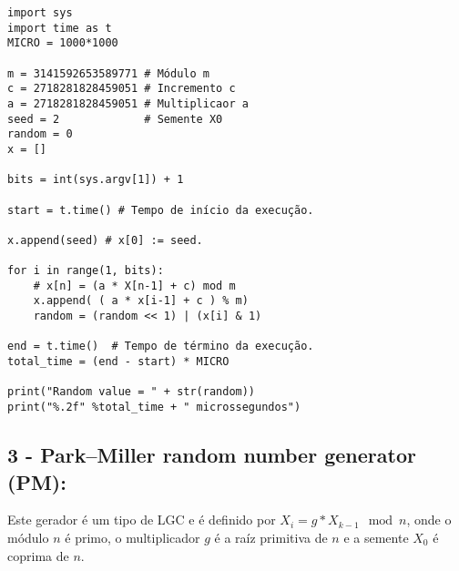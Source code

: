 \documentclass[
    article,            %
    11pt,               %
    oneside,            %
    a4paper,            %
    english,            %
    brazil,             %
    sumario=tradicional,
    ]{abntex2}
\begin{document}
\begin{lstlisting}[frame=single, title={lcg.py}]
import sys
import time as t
MICRO = 1000*1000

m = 3141592653589771 # Módulo m
c = 2718281828459051 # Incremento c
a = 2718281828459051 # Multiplicaor a
seed = 2             # Semente X0
random = 0            
x = []                

bits = int(sys.argv[1]) + 1

start = t.time() # Tempo de início da execução.

x.append(seed) # x[0] := seed.

for i in range(1, bits):
    # x[n] = (a * X[n-1] + c) mod m
    x.append( ( a * x[i-1] + c ) % m)
    random = (random << 1) | (x[i] & 1)
    
end = t.time()  # Tempo de término da execução.
total_time = (end - start) * MICRO

print("Random value = " + str(random))
print("%.2f" %total_time + " microssegundos")

\end{lstlisting}

\subsection*{\textbf{3 - Park–Miller random number generator (PM):}}

Este gerador é um tipo de LGC e é definido por $X_{i} = g * X_{k-1}\mod n$, onde o módulo $n$ é primo, o multiplicador $g$ é a raíz primitiva de $n$ e a semente $X_0$ é coprima de $n$.
\end{document}
